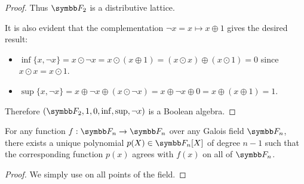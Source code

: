 \begin{proof}
  Thus \( \F_2 \) is a distributive lattice.

  It is also evident that the complementation \( \neg x = x \mapsto x \oplus 1 \) gives the desired result:
  \begin{itemize}
    \item \( \inf \{ x, \neg x \} = x \odot \neg x = x \odot (x \oplus 1) = (x \odot x) \oplus (x \odot 1) = 0 \) since \( x \odot x = x \odot 1 \).
    \item \( \sup \{ x, \neg x \} = x \oplus \neg x \oplus (x \odot \neg x) = x \oplus \neg x \oplus 0 = x \oplus (x \oplus 1) = 1 \).
  \end{itemize}

  Therefore \( (\F_2, 1, 0, \inf, \sup, \neg x ) \) is a Boolean algebra.
\end{proof}

\begin{proposition}
  For any function \( f: \F_n \to \F_n \) over any Galois field \( \F_n \), there exists a unique polynomial \( p(X) \in \F_n[X] \) of degree \( n - 1 \) such that the corresponding function \( p(x) \) agrees with \( f(x) \) on all of \( \F_n \).
\end{proposition}
\begin{proof}
  We simply use  on all points of the field.
\end{proof}
